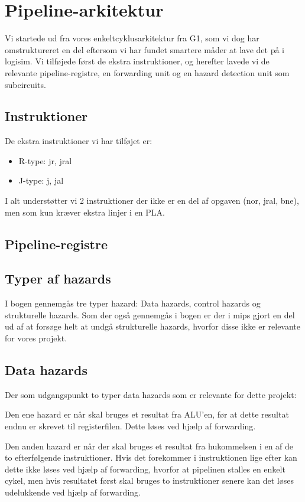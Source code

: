 \section{Pipeline-arkitektur}

Vi startede ud fra vores enkeltcyklusarkitektur fra G1, som vi dog har omstruktureret en del
eftersom vi har fundet smartere måder at lave det på i logisim. Vi tilføjede først de ekstra
instruktioner, og herefter lavede vi de relevante pipeline-registre, en forwarding unit og 
en hazard detection unit som subcircuits.  

\subsection{Instruktioner}
De ekstra instruktioner vi har tilføjet er:
\begin{itemize}
\item R-type: jr, jral
\item J-type: j, jal
\end{itemize}

I alt understøtter vi 2 instruktioner der ikke er en del af opgaven (nor, jral, bne), men som kun kræver ekstra
linjer i en PLA. 

\subsection{Pipeline-registre}

\subsection{Typer af hazards}
I bogen gennemgås tre typer hazard: Data hazards, control hazards og
strukturelle hazards. Som der også gennemgås i bogen er der i mips gjort en del
ud af at forsøge helt at undgå strukturelle hazards, hvorfor disse ikke er
relevante for vores projekt.

\subsection{Data hazards}
Der som udgangspunkt to typer data hazards som er relevante for dette projekt:

Den ene hazard er når skal bruges et resultat fra ALU'en, før at dette resultat endnu er skrevet
til registerfilen. Dette løses ved hjælp af forwarding.

Den anden hazard er når der skal bruges et resultat fra hukommelsen i en af de
to efterfølgende instruktioner. Hvis det forekommer i instruktionen lige efter
kan dette ikke løses ved hjælp af forwarding, hvorfor at pipelinen stalles en
enkelt cykel, men hvis resultatet først skal bruges to instruktioner senere kan
det løses udelukkende ved hjælp af forwarding.

